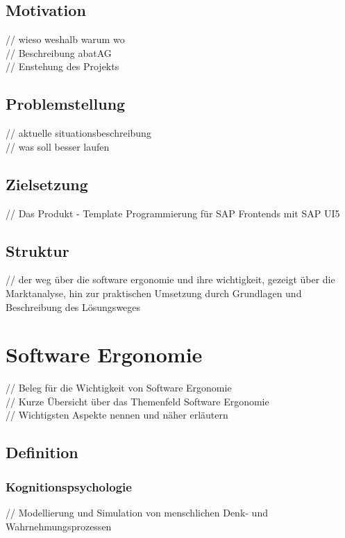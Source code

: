 \documentclass[12pt,a4paper,bibliography=totocnumbered,listof=totocnumbered]{scrartcl}
\begin{document}
\subsection{Motivation}
// wieso weshalb warum wo\\
// Beschreibung abatAG\\
// Enstehung des Projekts\\

\subsection{Problemstellung}
// aktuelle situationsbeschreibung\\
// was soll besser laufen\\

\pagebreak
\subsection{Zielsetzung}
// Das Produkt - Template Programmierung für SAP Frontends mit SAP UI5

\subsection{Struktur}
// der weg über die software ergonomie und ihre wichtigkeit, gezeigt über die Marktanalyse, hin zur praktischen Umsetzung durch Grundlagen und Beschreibung des Lösungsweges\\

\pagebreak
\section{Software Ergonomie}
// Beleg für die Wichtigkeit von Software Ergonomie\\
// Kurze Übersicht über das Themenfeld Software Ergonomie\\
// Wichtigsten Aspekte nennen und näher erläutern\\

\subsection{Definition}
\subsubsection{Kognitionspsychologie}
// Modellierung und Simulation von menschlichen Denk- und Wahrnehmungsprozessen\\
\end{document}
